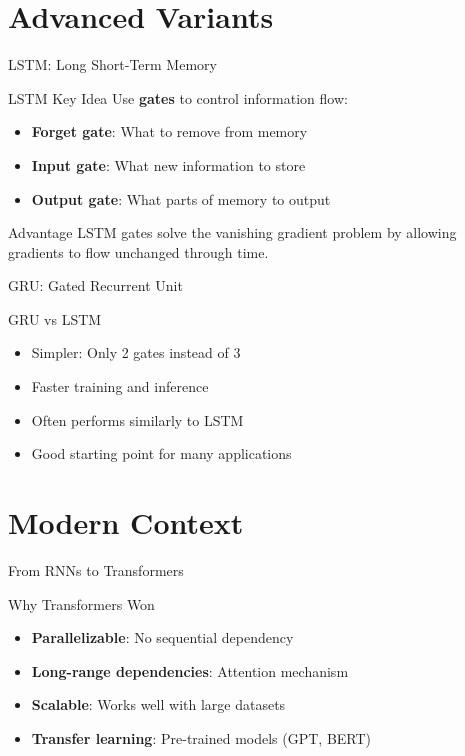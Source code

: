 \documentclass[usenames,dvipsnames]{beamer}
\begin{document}
	\section{Advanced Variants}
	
	\begin{frame}{LSTM: Long Short-Term Memory}
		\begin{definitionbox}{LSTM Key Idea}
			Use \textbf{gates} to control information flow:
			\begin{itemize}
				\item \textbf{Forget gate}: What to remove from memory
				\item \textbf{Input gate}: What new information to store  
				\item \textbf{Output gate}: What parts of memory to output
			\end{itemize}
		\end{definitionbox}
		
		\begin{theorembox}{Advantage}
			LSTM gates solve the vanishing gradient problem by allowing gradients to flow unchanged through time.
		\end{theorembox}
	\end{frame}
	
	\begin{frame}{GRU: Gated Recurrent Unit}
		\begin{keypointsbox}{GRU vs LSTM}
			\begin{itemize}
				\item Simpler: Only 2 gates instead of 3
				\item Faster training and inference
				\item Often performs similarly to LSTM
				\item Good starting point for many applications
			\end{itemize}
		\end{keypointsbox}
	\end{frame}
	
	\section{Modern Context}
	
	\begin{frame}{From RNNs to Transformers}
		\begin{theorembox}{Why Transformers Won}
			\begin{itemize}
				\item \textbf{Parallelizable}: No sequential dependency
				\item \textbf{Long-range dependencies}: Attention mechanism
				\item \textbf{Scalable}: Works well with large datasets
				\item \textbf{Transfer learning}: Pre-trained models (GPT, BERT)
			\end{itemize}
		\end{theorembox}
	\end{frame}
	
\end{document}
